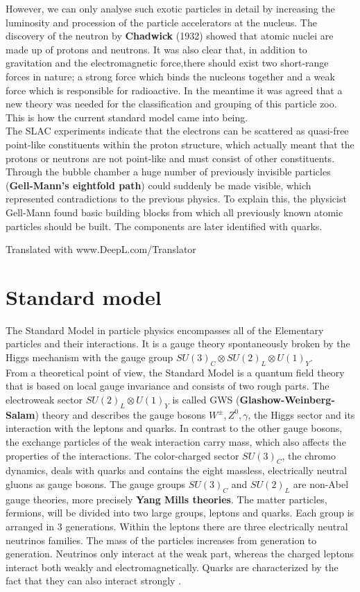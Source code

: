 However, we can only analyse such exotic particles in detail by increasing the luminosity and procession of the particle accelerators at the nucleus. 
The discovery of the neutron by \textbf{Chadwick} (1932) showed that atomic nuclei are made up of protons and neutrons. It was also clear that, in addition to gravitation and the electromagnetic force,there should exist two short-range forces in nature; a strong force which binds the nucleons together and a weak force which is responsible for radioactive.
In the meantime it was agreed that a new theory was needed for the classification and grouping of this particle zoo. This is how the current standard model came into being.\\
The SLAC experiments indicate that the electrons can be scattered as quasi-free point-like constituents within the proton structure, which actually meant that the protons or neutrons are not point-like and must consist of other constituents. Through the bubble chamber a huge number of previously invisible particles (\textbf{Gell-Mann's eightfold path}) could suddenly be made visible, which represented contradictions to the previous physics. To explain this, the physicist Gell-Mann found basic building blocks from which all previously known atomic particles should be built. The components are later identified with quarks. 

Translated with www.DeepL.com/Translator
\pagebreak
\section{Standard model}
The Standard Model in particle physics encompasses all of the
Elementary particles and their interactions. It is a gauge theory spontaneously broken by the Higgs mechanism with the gauge group $ SU(3)_C \otimes SU(2)_L \otimes U(1)_Y $.\\
From a theoretical point of view, the Standard Model is a quantum field theory that is based on local gauge invariance and consists of two rough parts. The electroweak sector $ SU(2)_L \otimes U(1)_Y $ is called GWS (\textbf{Glashow-Weinberg-Salam}) theory and describes the gauge bosons $ W^{\pm}, Z^0, \gamma $, the Higgs sector and its interaction with the leptons and quarks. In contrast to the other gauge bosons, the exchange particles of the weak interaction carry mass, which also affects the properties of the interactions. The color-charged sector $ SU(3)_C $, the chromo dynamics, deals with quarks and contains the eight massless, electrically neutral gluons as gauge bosons. The gauge groups $SU(3)_C$ and $SU(2)_L$ are non-Abel gauge theories, more precisely \textbf{Yang Mills theories}.
The matter particles, fermions, will be divided into two large groups, leptons and quarks. Each group is arranged in 3 generations. Within the leptons there are three electrically neutral neutrinos families. The mass of the particles increases from generation to generation. Neutrinos only interact at the weak part, whereas the charged leptons interact both weakly and electromagnetically. Quarks are characterized by the fact that they can also interact strongly \cite{edelhaeuser2016tutorium}. 

